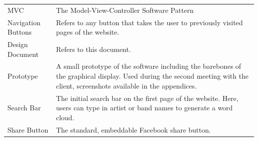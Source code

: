 \documentclass[]{article}
\begin{document}
\begin{longtable}[c]{@{}ll@{}}
\\\addlinespace
\begin{minipage}[t]{0.47\columnwidth}\raggedright
MVC
\end{minipage} & \begin{minipage}[t]{0.47\columnwidth}\raggedright
The Model-View-Controller Software Pattern
\end{minipage}
\\\addlinespace
\begin{minipage}[t]{0.47\columnwidth}\raggedright
Navigation Buttons
\end{minipage} & \begin{minipage}[t]{0.47\columnwidth}\raggedright
Refers to any button that takes the user to previously visited pages of
the website.
\end{minipage}
\\\addlinespace
\begin{minipage}[t]{0.47\columnwidth}\raggedright
Design Document
\end{minipage} & \begin{minipage}[t]{0.47\columnwidth}\raggedright
Refers to this document.
\end{minipage}
\\\addlinespace
\begin{minipage}[t]{0.47\columnwidth}\raggedright
Prototype
\end{minipage} & \begin{minipage}[t]{0.47\columnwidth}\raggedright
A small prototype of the software including the barebones of the
graphical display. Used during the second meeting with the client,
screenshots available in the appendices.
\end{minipage}
\\\addlinespace
\begin{minipage}[t]{0.47\columnwidth}\raggedright
Search Bar
\end{minipage} & \begin{minipage}[t]{0.47\columnwidth}\raggedright
The initial search bar on the first page of the website. Here, users can
type in artist or band names to generate a word cloud.
\end{minipage}
\\\addlinespace
\begin{minipage}[t]{0.47\columnwidth}\raggedright
Share Button
\end{minipage} & \begin{minipage}[t]{0.47\columnwidth}\raggedright
The standard, embeddable Facebook share button.

\end{minipage}
\end{longtable}
\end{document}
